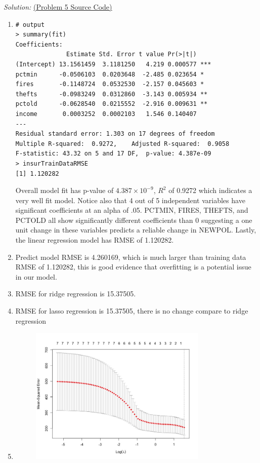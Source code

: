 \documentclass{article}
\newenvironment{solution}
    {\textit{Solution:}}
    {}
\begin{document}
\begin{solution}
\href{run:./src/p5.r}{ (Problem 5 Source Code)}
\begin{enumerate}
	\item \mbox{}
	\begin{lstlisting}
# output
> summary(fit)
Coefficients:
              Estimate Std. Error t value Pr(>|t|)    
(Intercept) 13.1561459  3.1181250   4.219 0.000577 ***
pctmin      -0.0506103  0.0203648  -2.485 0.023654 *  
fires       -0.1148724  0.0532530  -2.157 0.045603 *  
thefts      -0.0983249  0.0312860  -3.143 0.005934 ** 
pctold      -0.0628540  0.0215552  -2.916 0.009631 ** 
income       0.0003252  0.0002103   1.546 0.140407    
---
Residual standard error: 1.303 on 17 degrees of freedom
Multiple R-squared:  0.9272,	Adjusted R-squared:  0.9058 
F-statistic: 43.32 on 5 and 17 DF,  p-value: 4.387e-09
> insurTrainDataRMSE
[1] 1.120282
	\end{lstlisting}
	Overall model fit has p-value of $4.387\times 10^{-9}$, $R^2$ of 0.9272 which indicates a very well fit model. Notice also that 4 out of 5 independent variables have significant coefficients at an alpha of .05. PCTMIN, FIRES, THEFTS, and PCTOLD all show significantly different coefficients than 0 suggesting a one unit change in these variables predicts a reliable change in NEWPOL. Lastly, the linear regression model has RMSE of 1.120282.
	\item \mbox{}
	Predict model RMSE is 4.260169, which is much larger than training data RMSE of 1.120282, this is good evidence that overfitting is a potential issue in our model.
	\item \mbox{}
	RMSE for ridge regression is 15.37505.
	\item \mbox{}
	RMSE for lasso regression is 15.37505, there is no change compare to ridge regression
	\item \mbox{}
	\begin{figure}[h]
		\centering
		\includegraphics[width=0.8\textwidth]{figure5_Rplot.jpeg}

\end{figure}
\end{enumerate}
\end{solution}
\end{document}
